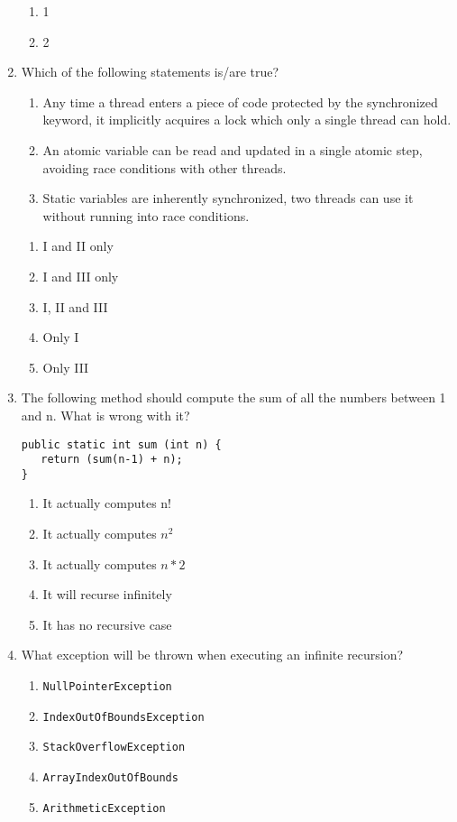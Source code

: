\documentclass[CS180-S16-FinalExam.tex]{subfiles}
\begin{document}
\begin{enumerate}
\begin{enumerate}
\item 1
\item 2
\end{enumerate}

\clearpage
\item Which of the following statements is/are true?
\begin{enumerate}[I]
\item Any time a thread enters a piece of code protected by the synchronized keyword, it implicitly acquires a lock which only a single thread can hold.
\item An atomic variable can be read and updated in a single atomic step, avoiding race conditions with other threads.
\item Static variables are inherently synchronized, two threads can use it without running into race conditions.
\end{enumerate}
\begin{enumerate}
\item I and II only \ifdraft \Ans \fi
\item I and III only
\item I, II and III
\item Only I
\item Only III
\end{enumerate}

\item The following method should compute the sum of all the numbers between 1 and n. What is wrong with it?
\begin{lstlisting}
public static int sum (int n) {
   return (sum(n-1) + n);
}
\end{lstlisting}

\begin{enumerate}
\item It actually computes n!
\item It actually computes $n^2$
\item It actually computes $n*2$
\item It will recurse infinitely \ifdraft \Ans \fi
\item It has no recursive case
\end{enumerate}

\item  What exception will be thrown when executing an infinite recursion?
\begin{enumerate}
\item \texttt{NullPointerException}
\item \texttt{IndexOutOfBoundsException}
\item \texttt{StackOverflowException} \ifdraft \Ans \fi
\item \texttt{ArrayIndexOutOfBounds}
\item \texttt{ArithmeticException}
\end{enumerate}


\end{enumerate}
\end{document}
